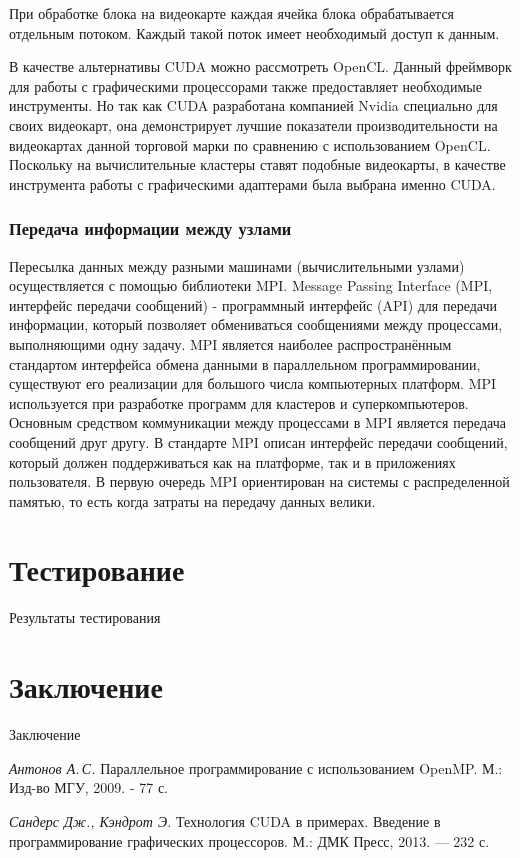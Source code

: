 \documentclass[a4paper, 14pt]{extarticle}
\theoremstyle{definition}
\begin{document}
\par При обработке блока на видеокарте каждая ячейка блока обрабатывается отдельным потоком. Каждый такой поток имеет необходимый доступ к данным.

\par В качестве альтернативы CUDA можно рассмотреть OpenCL. Данный фреймворк для работы с графическими процессорами также предоставляет необходимые инструменты. Но так как CUDA разработана компанией Nvidia специально для своих видеокарт, она демонстрирует лучшие показатели производительности на видеокартах данной торговой марки по сравнению с использованием OpenCL. Поскольку на вычислительные кластеры ставят подобные видеокарты, в качестве инструмента работы с графическими адаптерами была выбрана именно CUDA.

\subsubsection{Передача информации между узлами}

\par Пересылка данных между разными машинами (вычислительными узлами) осуществляется с помощью библиотеки MPI. Message Passing Interface (MPI, интерфейс передачи сообщений) - программный интерфейс (API) для передачи информации, который позволяет обмениваться сообщениями между процессами, выполняющими одну задачу. MPI является наиболее распространённым стандартом интерфейса обмена данными в параллельном программировании, существуют его реализации для большого числа компьютерных платформ. MPI используется при разработке программ для кластеров и суперкомпьютеров. Основным средством коммуникации между процессами в MPI является передача сообщений друг другу. В стандарте MPI описан интерфейс передачи сообщений, который должен поддерживаться как на платформе, так и в приложениях пользователя. В первую очередь MPI ориентирован на системы с распределенной памятью, то есть когда затраты на передачу данных велики.

\section{Тестирование}
Результаты тестирования

\section*{Заключение}
Заключение

\begin{thebibliography}{99}

\textit{Антонов А.\,С. } 
{Параллельное программирование с использованием OpenMP. 
М.: Изд-во МГУ, 2009. - 77 с. } 

\textit{Сандерс Дж., Кэндрот Э. } 
{Технология CUDA в примерах. Введение в программирование графических процессоров. 
М.: ДМК Пресс, 2013. — 232 с. } 

\end{thebibliography}
\end{document}
